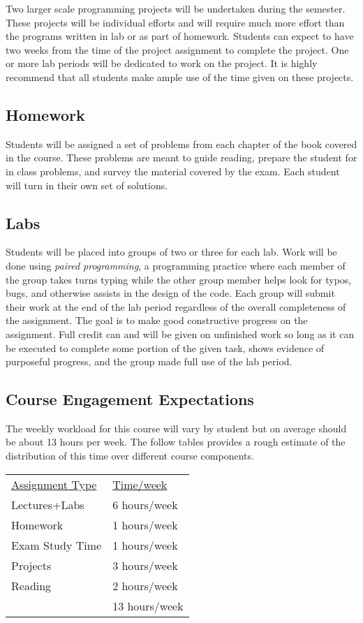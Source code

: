 \documentclass[10pt]{article}
\begin{document}
Two larger scale programming projects will be undertaken during the semester. These projects will be individual efforts and will require much more effort than the programs written in lab or as part of homework. Students can expect to have two weeks from the time of the project assignment to complete the project. One or more lab periods will be dedicated to work on the project. It is highly recommend that all students make ample use of the time given on these projects.

\subsection*{Homework}

Students will be assigned a set of problems from each chapter of the book covered in the course. These problems are meant to guide reading, prepare the student for in class problems, and survey the material covered by the exam. Each student will turn in their own set of solutions.

\subsection*{Labs}

Students will be placed into groups of two or three for each lab. Work will be done using \textit{paired programming}, a programming practice where each member of the group takes turns typing while the other group member helps look for typos, bugs, and otherwise assists in the design of the code. Each group will submit their work at the end of the lab period regardless of the overall completeness of the assignment. The goal is to make good constructive progress on the assignment. Full credit can and will be given on unfinished work so long as it can be executed to complete some portion of the given task, shows evidence of purposeful progress, and the group made full use of the lab period.

\subsection{Course Engagement Expectations}

The weekly workload for this course will vary by student but on average should be about 13 hours per week.  The follow tables provides a rough estimate of the distribution of this time over different course components.
\begin{center}
\begin{tabular}{ll}
\underline{Assignment Type} & \underline{Time/week} \\
Lectures+Labs       & 6 hours/week \\
Homework          & 1 hours/week \\
Exam Study Time    & 1 hours/week \\
Projects          & 3 hours/week \\
Reading &  2 hours/week \\
\bottomrule
 & 13 hours/week
\end{tabular}
\end{center}
\end{document}

